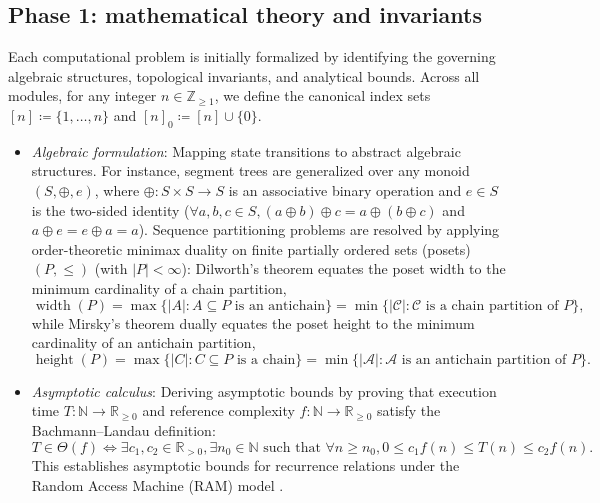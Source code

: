 \documentclass[10pt, letterpaper]{article}
\begin{document}
\subsection{Phase 1: mathematical theory and invariants}\label{sec:phase1_math}
Each computational problem is initially formalized by identifying the governing algebraic structures, topological invariants, and analytical bounds. Across all modules, for any integer $n \in \mathbb{Z}_{\ge 1}$, we define the canonical index sets $[n] \coloneqq \{1, \dots, n\}$ and $[n]_0 \coloneqq [n] \cup \{0\}$.
\begin{itemize}
    \item \textit{Algebraic formulation}: Mapping state transitions to abstract algebraic structures. For instance, segment trees are generalized over any monoid $(S, \oplus, e)$, where $\oplus: S \times S \to S$ is an associative binary operation and $e \in S$ is the two-sided identity ($\forall a,b,c \in S, (a \oplus b) \oplus c = a \oplus (b \oplus c)$ and $a \oplus e = e \oplus a = a$). Sequence partitioning problems are resolved by applying order-theoretic minimax duality on finite partially ordered sets (posets) $(P, \le)$ (with $|P| < \infty$): Dilworth's theorem equates the poset width to the minimum cardinality of a chain partition,
	\begin{equation}\label{eq:poset_duality}
		\operatorname{width}(P) = \max \{|A| : A \subseteq P \text{ is an antichain}\} = \min \{|\mathcal{C}| : \mathcal{C} \text{ is a chain partition of } P\},
	\end{equation}
	while Mirsky's theorem dually equates the poset height to the minimum cardinality of an antichain partition,
	\begin{equation}\label{eq:mirsky_duality}
		\operatorname{height}(P) = \max \{|C| : C \subseteq P \text{ is a chain}\} = \min \{|\mathcal{A}| : \mathcal{A} \text{ is an antichain partition of } P\}.
	\end{equation}
    \item \textit{Asymptotic calculus}: Deriving asymptotic bounds by proving that execution time $T: \mathbb{N} \to \mathbb{R}_{\ge 0}$ and reference complexity $f: \mathbb{N} \to \mathbb{R}_{\ge 0}$ satisfy the Bachmann--Landau definition:
\begin{equation}\label{eq:bachmann_landau}
    T \in \Theta(f) \iff \exists c_1, c_2 \in \mathbb{R}_{> 0}, \exists n_0 \in \mathbb{N} \text{ such that } \forall n \ge n_0, 0 \le c_1 f(n) \le T(n) \le c_2 f(n).
\end{equation}
This establishes asymptotic bounds for recurrence relations under the Random Access Machine (RAM) model \cite{knuth1997art}.
\end{itemize}
\end{document}
